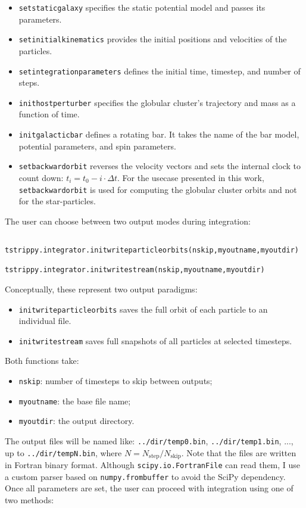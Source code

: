 \documentclass{article}
\begin{document}
        \begin{itemize}
            \item \texttt{setstaticgalaxy} specifies the static potential model and passes its parameters.
            \item \texttt{setinitialkinematics} provides the initial positions and velocities of the particles.
            \item \texttt{setintegrationparameters} defines the initial time, timestep, and number of steps.
            \item \texttt{inithostperturber} specifies the globular cluster's trajectory and mass as a function of time.
            \item \texttt{initgalacticbar} defines a rotating bar. It takes the name of the bar model, potential parameters, and spin parameters.
            \item \texttt{setbackwardorbit} reverses the velocity vectors and sets the internal clock to count down: $t_i = t_0 - i \cdot \Delta t$. For the usecase presented in this work, \texttt{setbackwardorbit} is used for computing the globular cluster orbits and not for the star-particles. 
        \end{itemize}
        The user can choose between two output modes during integration:
        \begin{lstlisting}
            tstrippy.integrator.initwriteparticleorbits(nskip,myoutname,myoutdir)
            tstrippy.integrator.initwritestream(nskip,myoutname,myoutdir)
        \end{lstlisting}
        Conceptually, these represent two output paradigms:
        \begin{itemize}
            \item \texttt{initwriteparticleorbits} saves the full orbit of each particle to an individual file.
            \item \texttt{initwritestream} saves full snapshots of all particles at selected timesteps.
        \end{itemize}
        Both functions take:
        \begin{itemize}
            \item \texttt{nskip}: number of timesteps to skip between outputs;
            \item\texttt{myoutname}: the base file name;
            \item \texttt{myoutdir}: the output directory.
        \end{itemize}
        The output files will be named like: \texttt{../dir/temp0.bin}, \texttt{../dir/temp1.bin}, ..., up to \texttt{../dir/tempN.bin}, where $N = N_\mathrm{step} / N_\mathrm{skip}$. Note that the files are written in Fortran binary format. Although \texttt{scipy.io.FortranFile} can read them, I use a custom parser based on \texttt{numpy.frombuffer} to avoid the SciPy dependency. Once all parameters are set, the user can proceed with integration using one of two methods:
\end{document}
